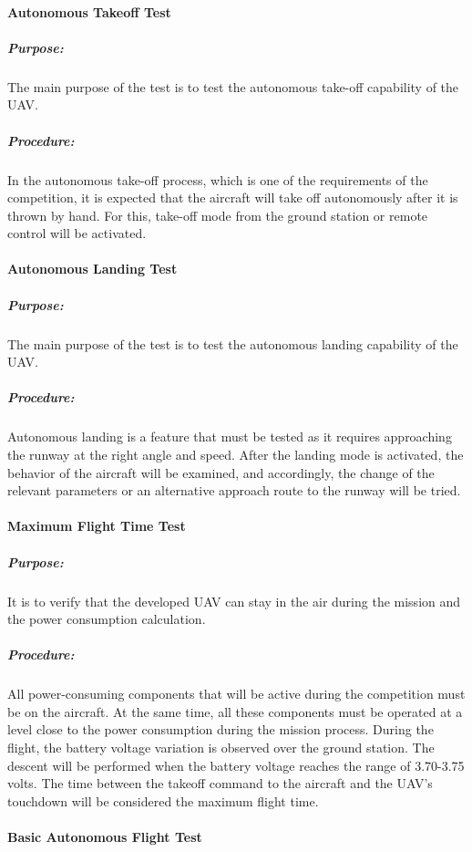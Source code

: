 \documentclass[12pt]{article}
\begin{document}
\paragraph{Autonomous Takeoff Test} 

\subparagraph*{Purpose:} The main purpose of the test is to test the autonomous take-off capability of the UAV.

\subparagraph*{Procedure:} In the autonomous take-off process, which is one of the requirements of the competition, it is expected that the aircraft will take off autonomously after it is thrown by hand. For this, take-off mode from the ground station or remote control will be activated.

\paragraph{Autonomous Landing Test} 

\subparagraph*{Purpose:} The main purpose of the test is to test the autonomous landing capability of the UAV.

\subparagraph*{Procedure:} Autonomous landing is a feature that must be tested as it requires approaching the runway at the right angle and speed. After the landing mode is activated, the behavior of the aircraft will be examined, and accordingly, the change of the relevant parameters or an alternative approach route to the runway will be tried.

\paragraph{Maximum Flight Time Test} 

\subparagraph*{Purpose:} It is to verify that the developed UAV can stay in the air during the mission and the power consumption calculation.

\subparagraph*{Procedure:} All power-consuming components that will be active during the competition must be on the aircraft. At the same time, all these components must be operated at a level close to the power consumption during the mission process. During the flight, the battery voltage variation is observed over the ground station. The descent will be performed when the battery voltage reaches the range of 3.70-3.75 volts. The time between the takeoff command to the aircraft and the UAV's touchdown will be considered the maximum flight time.

\paragraph{Basic Autonomous Flight Test} 
\end{document}
